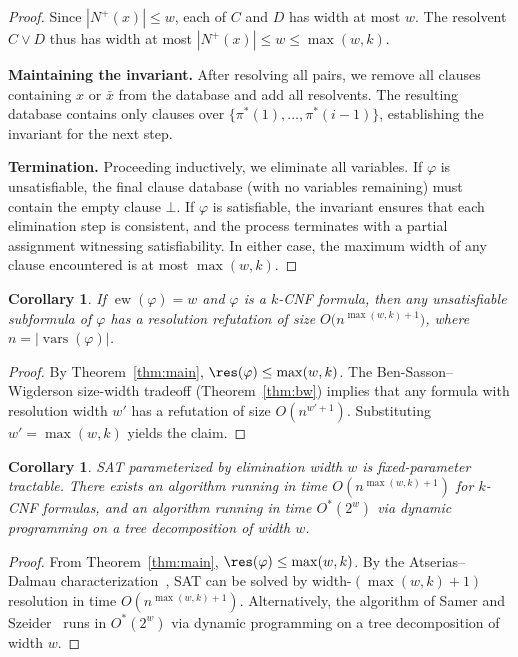 \documentclass[11pt]{article}
\newtheorem{corollary}[theorem]{Corollary}
\DeclareMathOperator{\ew}{ew}
\DeclareMathOperator{\vars}{vars}
\begin{document}
\begin{proof}
Since $|N^+(x)| \leq w$, each of $C$ and $D$ has width at most $w$. The resolvent $C \lor D$ thus has width at most $|N^+(x)| \leq w \leq \max(w,k)$.

\textbf{Maintaining the invariant.} After resolving all pairs, we remove all clauses containing $x$ or $\bar{x}$ from the database and add all resolvents. The resulting database contains only clauses over $\{\pi^*(1), \ldots, \pi^*(i-1)\}$, establishing the invariant for the next step.

\textbf{Termination.} Proceeding inductively, we eliminate all variables. If $\varphi$ is unsatisfiable, the final clause database (with no variables remaining) must contain the empty clause $\bot$. If $\varphi$ is satisfiable, the invariant ensures that each elimination step is consistent, and the process terminates with a partial assignment witnessing satisfiability. In either case, the maximum width of any clause encountered is at most $\max(w, k)$.
\end{proof}

\begin{corollary}
\label{cor:short-proofs}
If $\ew(\varphi) = w$ and $\varphi$ is a $k$-CNF formula, then any unsatisfiable subformula of $\varphi$ has a resolution refutation of size $O\bigl(n^{\max(w,k)+1}\bigr)$, where $n = |\vars(\varphi)|$.
\end{corollary}

\begin{proof}
By Theorem~\ref{thm:main}, $\res(\varphi) \leq \max(w,k)$. The Ben-Sasson--Wigderson size-width tradeoff (Theorem~\ref{thm:bw}) implies that any formula with resolution width $w'$ has a refutation of size $O(n^{w'+1})$. Substituting $w' = \max(w,k)$ yields the claim.
\end{proof}

\begin{corollary}
\label{cor:fpt}
SAT parameterized by elimination width $w$ is fixed-parameter tractable. There exists an algorithm running in time $O(n^{\max(w,k)+1})$ for $k$-CNF formulas, and an algorithm running in time $O^*(2^w)$ via dynamic programming on a tree decomposition of width $w$.
\end{corollary}

\begin{proof}
From Theorem~\ref{thm:main}, $\res(\varphi) \leq \max(w,k)$. By the Atserias--Dalmau characterization~\cite{AD03}, SAT can be solved by width-$(\max(w,k)+1)$ resolution in time $O(n^{\max(w,k)+1})$. Alternatively, the algorithm of Samer and Szeider~\cite{SS10} runs in $O^*(2^w)$ via dynamic programming on a tree decomposition of width $w$.
\end{proof}
\end{document}
